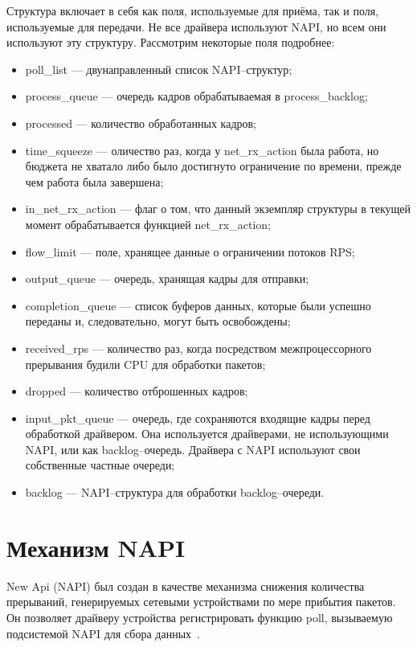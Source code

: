 Структура включает в себя как поля, используемые для приёма, так и поля, используемые для передачи. Не все драйвера используют NAPI, но всем они используют эту структуру. Рассмотрим некоторые поля подробнее:
\begin{itemize}[label=---]
	\item poll\_list --- двунаправленный список NAPI--структур;
	\item process\_queue --- очередь кадров обрабатываемая в process\_backlog;
	\item processed --- количество обработанных кадров;
	\item time\_squeeze --- оличество раз, когда у net\_rx\_action была работа, но бюджета не хватало либо было достигнуто ограничение по времени, прежде чем работа была завершена;
	\item in\_net\_rx\_action --- флаг о том, что данный экземпляр структуры в текущей момент обрабатывается функцией  net\_rx\_action;
	\item flow\_limit --- поле, хранящее данные о ограничении потоков RPS;
	\item output\_queue --- очередь, хранящая кадры для отправки;
	\item completion\_queue --- список буферов данных, которые были успешно переданы и, следовательно, могут быть освобождены;
	\item received\_rps --- количество раз, когда посредством межпроцессорного прерывания будили CPU для обработки пакетов;
	\item dropped --- количество отброшенных кадров;
	\item input\_pkt\_queue --- очередь, где сохраняются входящие кадры перед обработкой драйвером. Она используется драйверами, не использующими NAPI, или как backlog--очередь. Драйвера с NAPI используют свои собственные частные очереди;
	\item backlog --- NAPI--структура для обработки backlog--очереди.
\end{itemize}

\section{Механизм NAPI}

New Api (NAPI) был создан в качестве механизма снижения количества прерываний, генерируемых сетевыми устройствами по мере прибытия пакетов. Он позволяет драйверу устройства регистрировать функцию poll, вызываемую подсистемой NAPI для сбора данных~\cite{rec}.

